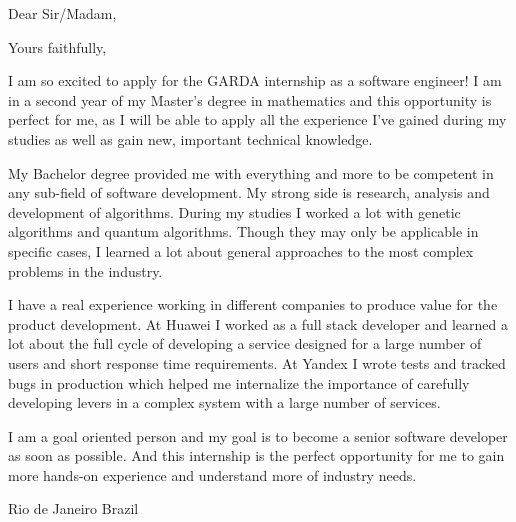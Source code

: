\documentclass[12pt,a4paper,sans]{moderncv}        %
\begin{document}
	\clearpage
	\date{\today}
	\opening{Dear Sir/Madam,}
	\closing{Yours faithfully,}
	\makelettertitle
	I am so excited to apply for the GARDA internship as a software engineer! I am in a second year of my Master's degree in mathematics and this opportunity is perfect for me, as I will be able to apply all the experience I've gained during my studies as well as gain new, important technical knowledge.
	
	My Bachelor degree provided me with everything and more to be competent in any sub-field of software development. My strong side is research, analysis and development of algorithms. During my studies I worked a lot with genetic algorithms and quantum algorithms. Though they may only be applicable in specific cases, I learned a lot about general approaches to the most complex problems in the industry.
	
	I have a real experience working in different companies to produce value for the product development. At Huawei I worked as a full stack developer and learned a lot about the full cycle of developing a service designed for a large number of users and short response time requirements. At Yandex I wrote tests and tracked bugs in production which helped me internalize the importance of carefully developing levers in a complex system with a large number of services.
	
	I am a goal oriented person and my goal is to become a senior software developer as soon as possible. And this internship is the perfect opportunity for me to gain more hands-on experience and understand more of industry needs.
	

	
	\title{}
	\address{Rua Barata Ribeiro 194}{Rio de Janeiro}{ Brazil }
	\makeletterclosing
	\name{}{}
\end{document}

